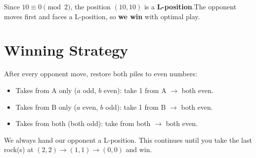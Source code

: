 \documentclass{article}
\begin{document}
Since $10 \equiv 0 \pmod{2}$, the position $(10,10)$ is a \textbf{L-position}.The opponent moves first and faces a L-position, so \textbf{we win} with optimal play.

\section*{Winning Strategy}

After every opponent move, restore both piles to even numbers:

\begin{itemize}
  \item Takes from A only ($a$ odd, $b$ even): take 1 from A $\to$ both even.
  \item Takes from B only ($a$ even, $b$ odd): take 1 from B $\to$ both even.
  \item Takes from both (both odd): take from both $\to$ both even.
\end{itemize}

\noindent We always hand our opponent a L-position. This continues until you take the last rock(s) at $(2,2) \to (1,1) \to (0,0)$ and win.
\end{document}

